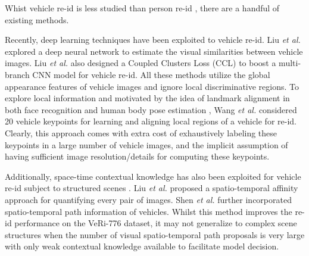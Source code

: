 \documentclass[10pt,twocolumn,letterpaper]{article}
\def\etal{\emph{et al.\hspace{0.3em}}}
\begin{document}
Whist vehicle re-id is less studied than person re-id
\cite{gong2014person,li2014deepreid,ahmed2015improved,xiao2016learning,li2017person,sun2017svdnet,Li2018Harmonious,zhong2017camera},
there are a handful of existing methods.


Recently, deep learning techniques have been exploited to vehicle re-id.  Liu
\etal \cite{Liu2016eccv_veri} explored a deep neural network to estimate the
visual similarities between vehicle images.
%
Liu \etal \cite{Liu2016cvpr_drdl} also designed a Coupled Clusters Loss (CCL)
to boost a multi-branch CNN model for vehicle re-id.
%
All these methods utilize the global appearance features of vehicle images and
ignore local discriminative regions.
%
To explore local information and motivated by the idea of landmark alignment
\cite{zhang2014facial} in both face recognition \cite{taigman2014deepface} and
human body pose estimation \cite{newell2016stacked}, Wang \etal
\cite{Wang_2017_ICCV} considered 20 vehicle keypoints for learning and aligning
local regions of a vehicle for re-id.  Clearly, this approach comes with extra
cost of exhaustively labeling these keypoints in a large number of vehicle
images, and the implicit assumption of having sufficient image
resolution/details for computing these keypoints.
%

Additionally,
space-time contextual knowledge has also been exploited for vehicle re-id
subject to structured scenes \cite{Liu2016eccv_veri,Shen_2017_ICCV}.
Liu \etal \cite{Liu2016eccv_veri} proposed
a spatio-temporal affinity approach for quantifying every pair of images.
%
Shen \etal \cite{Shen_2017_ICCV} further
incorporated spatio-temporal path information of vehicles.
Whilst this method improves the re-id performance on the VeRi-776 dataset,
it may not generalize to complex scene structures when the number of
visual spatio-temporal path proposals is very large with only weak contextual
knowledge available to facilitate model decision.
\end{document}
